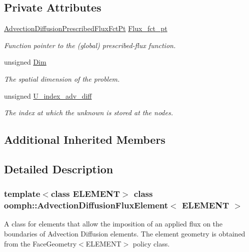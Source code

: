 \subsection*{Private Attributes}
\begin{DoxyCompactItemize}
\item 
\hyperlink{classoomph_1_1AdvectionDiffusionFluxElement_aeb9eb0a65d6dfe3673f6910a6fd7cf59}{Advection\+Diffusion\+Prescribed\+Flux\+Fct\+Pt} \hyperlink{classoomph_1_1AdvectionDiffusionFluxElement_a7c0b0eda4c03c14b18963c59b2c80a67}{Flux\+\_\+fct\+\_\+pt}
\begin{DoxyCompactList}\small\item\em Function pointer to the (global) prescribed-\/flux function. \end{DoxyCompactList}\item 
unsigned \hyperlink{classoomph_1_1AdvectionDiffusionFluxElement_a9418de31c96e89d011b6627cb5756e1e}{Dim}
\begin{DoxyCompactList}\small\item\em The spatial dimension of the problem. \end{DoxyCompactList}\item 
unsigned \hyperlink{classoomph_1_1AdvectionDiffusionFluxElement_a70092d79adb469c7b8fb34b1c31903a1}{U\+\_\+index\+\_\+adv\+\_\+diff}
\begin{DoxyCompactList}\small\item\em The index at which the unknown is stored at the nodes. \end{DoxyCompactList}\end{DoxyCompactItemize}
\subsection*{Additional Inherited Members}


\subsection{Detailed Description}
\subsubsection*{template$<$class E\+L\+E\+M\+E\+NT$>$\newline
class oomph\+::\+Advection\+Diffusion\+Flux\+Element$<$ E\+L\+E\+M\+E\+N\+T $>$}

A class for elements that allow the imposition of an applied flux on the boundaries of Advection Diffusion elements. The element geometry is obtained from the Face\+Geometry$<$\+E\+L\+E\+M\+E\+N\+T$>$ policy class. 


